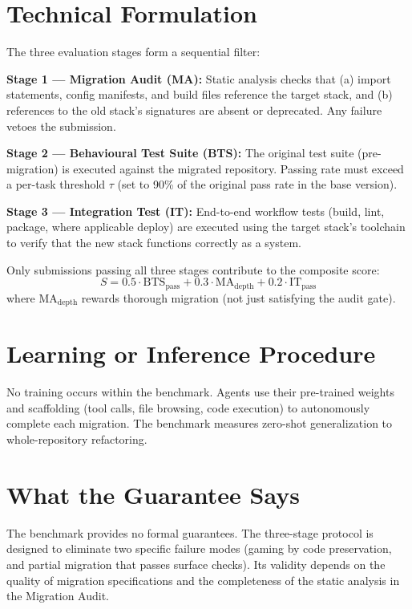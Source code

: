 \documentclass[10pt,twocolumn]{article}
\begin{document}
\section{Technical Formulation}

The three evaluation stages form a sequential filter:

\textbf{Stage 1 — Migration Audit (MA):} Static analysis checks
that (a) import statements, config manifests, and build files
reference the target stack, and (b) references to the old stack's
signatures are absent or deprecated. Any failure vetoes the submission.

\textbf{Stage 2 — Behavioural Test Suite (BTS):} The original test
suite (pre-migration) is executed against the migrated repository.
Passing rate must exceed a per-task threshold $\tau$ (set to 90\%
of the original pass rate in the base version).

\textbf{Stage 3 — Integration Test (IT):} End-to-end workflow tests
(build, lint, package, where applicable deploy) are executed using
the target stack's toolchain to verify that the new stack functions
correctly as a system.

Only submissions passing all three stages contribute to the composite
score:
\[
  S = 0.5 \cdot \text{BTS}_\text{pass} + 0.3 \cdot \text{MA}_\text{depth}
    + 0.2 \cdot \text{IT}_\text{pass}
\]
where $\text{MA}_\text{depth}$ rewards thorough migration (not just
satisfying the audit gate).

\section{Learning or Inference Procedure}

No training occurs within the benchmark. Agents use their pre-trained
weights and scaffolding (tool calls, file browsing, code execution)
to autonomously complete each migration. The benchmark measures
zero-shot generalization to whole-repository refactoring.

\section{What the Guarantee Says}

The benchmark provides no formal guarantees. The three-stage protocol
is designed to eliminate two specific failure modes (gaming by code
preservation, and partial migration that passes surface checks). Its
validity depends on the quality of migration specifications and the
completeness of the static analysis in the Migration Audit.
\end{document}
